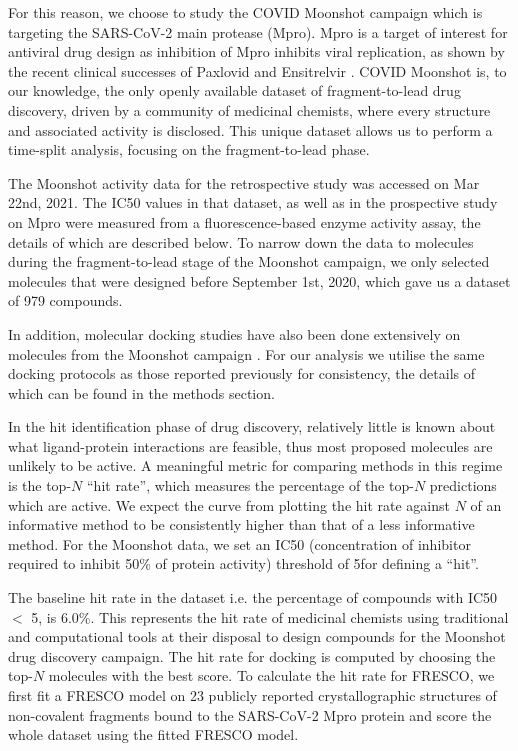 For this reason, we choose to study the COVID Moonshot campaign \cite{Moonshot2022} which is targeting the SARS-CoV-2 main protease (Mpro). Mpro is a target of interest for antiviral drug design as inhibition of Mpro inhibits viral replication, as shown by the recent clinical successes of Paxlovid and Ensitrelvir \cite{Dafydd2021Paxlovid,unoh2022discovery}. COVID Moonshot is, to our knowledge, the only openly available dataset of fragment-to-lead drug discovery, driven by a community of medicinal chemists, where every structure and associated activity is disclosed. This unique dataset allows us to perform a time-split analysis, focusing on the fragment-to-lead phase.

The Moonshot activity data for the retrospective study was accessed on Mar 22nd, 2021. The IC50 values in that dataset, as well as in the prospective study on Mpro were measured from a fluorescence-based enzyme activity assay, the details of which are described below. To narrow down the data to molecules during the fragment-to-lead stage of the Moonshot campaign, we only selected molecules that were designed before September 1st, 2020, which gave us a dataset of 979 compounds.

In addition, molecular docking studies have also been done extensively on molecules from the Moonshot campaign \cite{Morris2021Rank, Saar2021biorxiv}. For our analysis we utilise the same docking protocols as those reported previously for consistency, the details of which can be found in the methods section.

In the hit identification phase of drug discovery, relatively little is known about what ligand-protein interactions are feasible, thus most proposed molecules are unlikely to be active. A meaningful metric for comparing methods in this regime is the top-$N$ ``hit rate'', which measures the percentage of the top-$N$ predictions which are active. We expect the curve from plotting the hit rate against $N$ of an informative method to be consistently higher than that of a less informative method. For the Moonshot data, we set an IC50 (concentration of inhibitor required to inhibit 50\% of protein activity) threshold of 5\uM for defining a ``hit''.

The baseline hit rate in the dataset i.e. the percentage of compounds with IC50 $<$ 5\uM, is 6.0\%. This represents the hit rate of medicinal chemists using traditional and computational tools at their disposal to design compounds for the Moonshot drug discovery campaign. The hit rate for docking is computed by choosing the top-$N$ molecules with the best score. To calculate the hit rate for FRESCO, we first fit a FRESCO model on 23 publicly reported crystallographic structures of non-covalent fragments bound to the SARS-CoV-2 Mpro protein \cite{Douangamath2020XChem} and score the whole dataset using the fitted FRESCO model.

